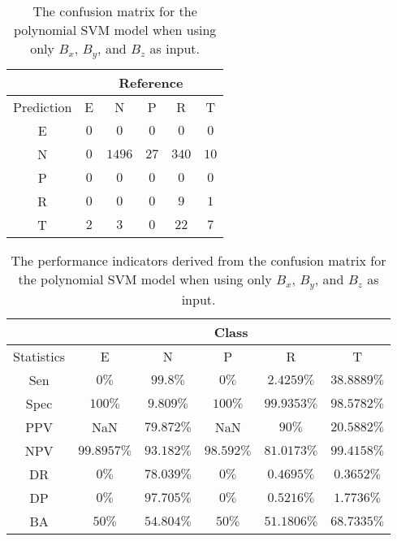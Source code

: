 \begin{table}[!ht]
	\centering
	\begin{tabular}{|c|c|c|c|c|c|}
		\hline
		 & \multicolumn{5}{|c|}{Reference} \\ \hline
		 Prediction & E & N & P & R & T \\ \hline
		 E & $0$ & $0$ & $0$ & $0$ & $0$ \\ \hline
		 N & $0$ & $1496$ & $27$ & $340$ & $10$ \\ \hline
		 P & $0$ & $0$ & $0$ & $0$ & $0$ \\ \hline
		 R & $0$ & $0$ & $0$ & $9$ & $1$ \\ \hline
		 T & $2$ & $3$ & $0$ & $22$ & $7$ \\ \hline
	\end{tabular}
	\caption{The confusion matrix for the polynomial SVM model when using only $B_{x}$, $B_{y}$, and $B_{z}$ as input.}
	\label{tab:cm:coord:svmPoly}
\end{table}

\begin{table}[!ht]
	\centering
	\begin{tabular}{|c|c|c|c|c|c|}
		\hline
		 & \multicolumn{5}{c|}{Class} \\ \hline
		Statistics & E & N & P & R & T \\ \hline
		Sen & $0\%$ & $99.8\%$ & $0\%$ & $2.4259\%$ & $38.8889\%$ \\ \hline
		Spec & $100\%$ & $9.809\%$ & $100\%$ & $99.9353\%$ & $98.5782\%$ \\ \hline
		PPV & NaN & $79.872\%$ & NaN & $90\%$ & $20.5882\%$ \\ \hline
		NPV & $99.8957\%$ & $93.182\%$ & $98.592\%$ & $81.0173\%$ & $99.4158\%$ \\ \hline
		DR & $0\%$ & $78.039\%$ & $0\%$ & $0.4695\%$ & $0.3652\%$ \\ \hline
		DP & $0\%$ & $97.705\%$ & $0\%$ & $0.5216\%$ & $1.7736\%$ \\ \hline
		BA & $50\%$ & $54.804\%$ & $50\%$ & $51.1806\%$ & $68.7335\%$ \\ \hline
	\end{tabular}
	\caption{The performance indicators derived from the confusion matrix for the polynomial SVM model when using only $B_{x}$, $B_{y}$, and $B_{z}$ as input.}
	\label{tab:cs:reverse:coord:svmPoly}
\end{table}

